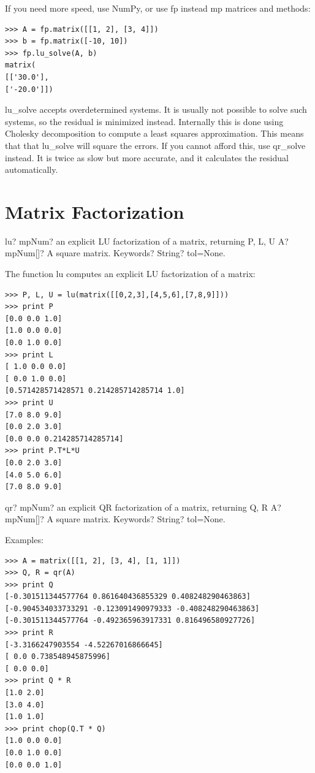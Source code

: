 If you need more speed, use NumPy, or use fp instead mp matrices and methods:

\begin{lstlisting}
>>> A = fp.matrix([[1, 2], [3, 4]])
>>> b = fp.matrix([-10, 10])
>>> fp.lu_solve(A, b)
matrix(
[['30.0'],
['-20.0']])
\end{lstlisting}

lu\_solve accepts overdetermined systems. It is usually not possible to solve such systems, so the residual is minimized instead. Internally this is done using Cholesky decomposition to compute a least squares approximation. This means that that lu\_solve will square the errors. If you cannot afford this, use qr\_solve instead. It is twice as slow but more accurate, and it calculates the residual automatically.



\newpage
\section{Matrix Factorization}

\begin{mpFunctionsExtract}
	\mpFunctionTwo
	{lu? mpNum? an explicit LU factorization of a matrix, returning P, L, U}
	{A? mpNum[]? A square matrix.}
	{Keywords? String?  tol=None.}
\end{mpFunctionsExtract}


The function lu computes an explicit LU factorization of a matrix:

\begin{lstlisting}
>>> P, L, U = lu(matrix([[0,2,3],[4,5,6],[7,8,9]]))
>>> print P
[0.0 0.0 1.0]
[1.0 0.0 0.0]
[0.0 1.0 0.0]
>>> print L
[ 1.0 0.0 0.0]
[ 0.0 1.0 0.0]
[0.571428571428571 0.214285714285714 1.0]
>>> print U
[7.0 8.0 9.0]
[0.0 2.0 3.0]
[0.0 0.0 0.214285714285714]
>>> print P.T*L*U
[0.0 2.0 3.0]
[4.0 5.0 6.0]
[7.0 8.0 9.0]
\end{lstlisting}




\begin{mpFunctionsExtract}
	\mpFunctionTwo
	{qr? mpNum? an explicit QR factorization of a matrix, returning Q, R}
	{A? mpNum[]? A square matrix.}
	{Keywords? String?  tol=None.}
\end{mpFunctionsExtract}

\vpara
Examples:

\begin{lstlisting}
>>> A = matrix([[1, 2], [3, 4], [1, 1]])
>>> Q, R = qr(A)
>>> print Q
[-0.301511344577764 0.861640436855329 0.408248290463863]
[-0.904534033733291 -0.123091490979333 -0.408248290463863]
[-0.301511344577764 -0.492365963917331 0.816496580927726]
>>> print R
[-3.3166247903554 -4.52267016866645]
[ 0.0 0.738548945875996]
[ 0.0 0.0]
>>> print Q * R
[1.0 2.0]
[3.0 4.0]
[1.0 1.0]
>>> print chop(Q.T * Q)
[1.0 0.0 0.0]
[0.0 1.0 0.0]
[0.0 0.0 1.0]
\end{lstlisting}






